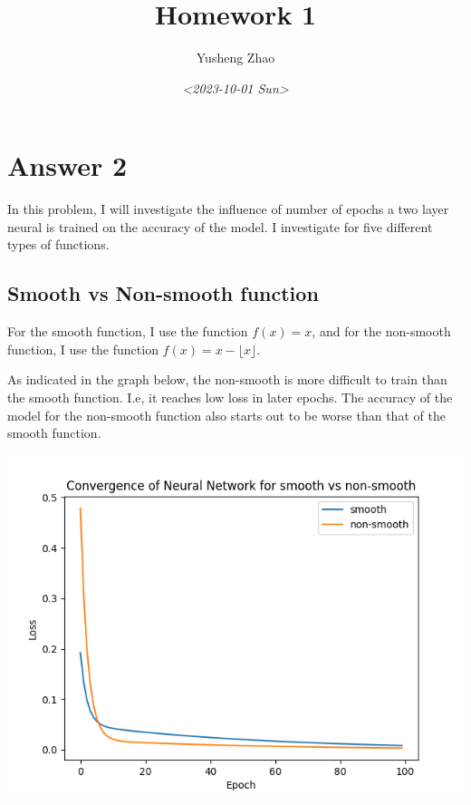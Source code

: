 \documentclass[11pt]{article}
\author{Yusheng Zhao}
\date{\textit{<2023-10-01 Sun>}}
\title{Homework 1}
\begin{document}
\maketitle
\section{Answer 2}
\label{sec:org543eb0e}
In this problem, I will investigate the influence of number of epochs a two
layer neural is trained on the accuracy of the model. I investigate for five different types of functions.
\subsection{Smooth vs Non-smooth function}
\label{sec:org73c551b}
For the smooth function, I use the function \(f(x) = x\), and for the
non-smooth function, I use the function \(f(x) = x - \lfloor x \rfloor\).

As indicated in the graph below, the non-smooth is more difficult to train than
the smooth function. I.e, it reaches low loss in later epochs. The accuracy of
the model for the non-smooth function also starts out to be worse than that of
the smooth function.

\begin{center}
\includegraphics[width=.9\linewidth]{plots/convergence_smooth vs non-smooth.png}
\end{center}
\end{document}
